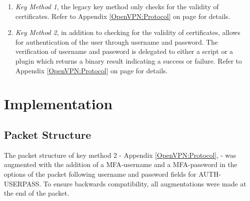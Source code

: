 \documentclass[11pt,oneside]{book}
\begin{document}
\begin{enumerate}
    \item \emph{Key Method 1}, the legacy key method only checks for the validity of certificates.
        Refer to Appendix \ref{OpenVPN:Protocol} on page \pageref{OpenVPN:Protocol} for details.
    \item \emph{Key Method 2}, in addition to checking for the validity of certificates, allows for
        authentication of the user through username and password. The verification of username and
        password is delegated to either a script or a plugin which returns a binary result
        indicating a success or failure.
        Refer to Appendix \ref{OpenVPN:Protocol} on page \pageref{OpenVPN:Protocol} for details.
\end{enumerate}

\section{Implementation}
\label{MFA:Implementation}
\subsection{Packet Structure}
The packet structure of key method 2 - Appendix \ref{OpenVPN:Protocol}, \pageref{OpenVPN:protocol} -
was augmented with the addition of a MFA-username and a MFA-password in the options of the packet
following username and password fields for AUTH-USERPASS. To ensure backwards compatibility, all
augmentations were made at the end of the packet.
\end{document}
